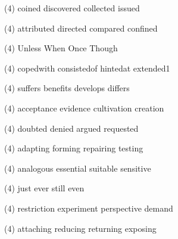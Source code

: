 \item
\begin{tasks}(4)
	\task coined
	\task discovered
	\task collected
	\task issued
\end{tasks}
\item
\begin{tasks}(4)
	\task attributed
	\task directed
	\task compared
	\task confined
\end{tasks}
\item
\begin{tasks}(4)
	\task Unless
	\task When
	\task Once
	\task Though
\end{tasks}
\item
\begin{tasks}(4)
	\task copedwith
	\task consistedof
	\task hintedat
	\task extended1
\end{tasks}
\item
\begin{tasks}(4)
	\task suffers
	\task benefits
	\task develops
	\task differs
\end{tasks}
\item
\begin{tasks}(4)
	\task acceptance
	\task evidence
	\task cultivation
	\task creation
\end{tasks}
\item
\begin{tasks}(4)
	\task doubted
	\task denied
	\task argued
	\task requested
\end{tasks}
\item
\begin{tasks}(4)
	\task adapting
	\task forming
	\task repairing
	\task testing
\end{tasks}
\item
\begin{tasks}(4)
	\task analogous
	\task essential
	\task suitable
	\task sensitive
\end{tasks}
\item
\begin{tasks}(4)
	\task just
	\task ever
	\task still
	\task even
\end{tasks}
\item
\begin{tasks}(4)
	\task restriction
	\task experiment
	\task perspective
	\task demand
\end{tasks}
\item
\begin{tasks}(4)
	\task attaching
	\task reducing
	\task returning
	\task exposing
\end{tasks}
